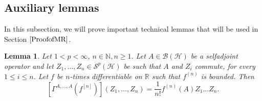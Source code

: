 \documentclass[12pt]{amsart}
\newtheorem{lemma}[theorem]{Lemma}
\theoremstyle{remark}
\begin{document}
\subsection{Auxiliary lemmas}\label{SubAux}


In this subsection, we will prove important technical lemmas that will be used in Section $\ref{ProofofMR}$. 


\begin{lemma}\label{MOIcomm}
Let $1 < p < \infty$, $n \in \mathbb{N}, n \geq 1$. Let $A \in \mathcal{B}(\mathcal{H})$ be a selfadjoint operator and let $Z_1, \ldots, Z_n \in \mathcal{S}^p(\mathcal{H})$ be such that $A$ and $Z_i$ commute, for every $1\leq i\leq n$. Let $f$ be $n$-times differentiable on $\mathbb{R}$ such that $f^{(n)}$ is bounded. Then
$$
\left[ \Gamma^{A, \ldots, A}(f^{[n]}) \right] (Z_1, \ldots, Z_n) = \dfrac{1}{n!} f^{(n)}(A)Z_1\ldots Z_n.
$$
\end{lemma}
\end{document}
